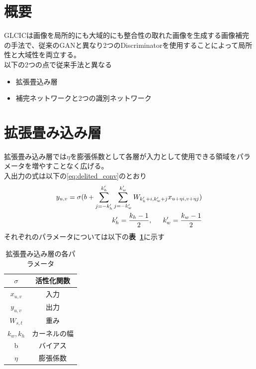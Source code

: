 \documentclass[a4j, 11pt]{jreport}
\newcommand{\tabref}[1]{\textbf{表~\ref{#1}}}
\begin{document}
\section{概要}
GLCICは画像を局所的にも大域的にも整合性の取れた画像を生成する画像補完の手法で、従来のGANと異なり2つのDiscriminatorを使用することによって局所性と大域性を両立する。\\
以下の2つの点で従来手法と異なる
\begin{itemize}
	\item 拡張畳込み層
	\item 補完ネットワークと2つの識別ネットワーク
\end{itemize}
\section{拡張畳み込み層}
拡張畳み込み層では$\eta$を膨張係数として各層が入力として使用できる領域をパラメータを増やすことなく広げる。\\
入出力の式は以下の\eqref{eq:delited_conv}のとおり
\begin{eqnarray}
	y_{u,v}=\sigma(b+\sum^{k'_h}_{j=-k'_h}\sum^{k'_w}_{j=-k'_w}W_{k'_h+i,k'_w+j}x_{u+\eta i,v+\eta j}) \\
	k'_h =\frac{k_h-1}{2},\indent k'_w =\frac{k_w-1}{2}
	\label{eq:delited_conv}
\end{eqnarray}
それぞれのパラメータについては以下の\tabref{tb:delited_conv}に示す
\begin{table}[H]
	\centering
	\caption{拡張畳み込み層の各パラメータ}
	\begin{tabular}{|c|c|}
	\hline
	$\sigma$ & 活性化関数  \\ \hline
	$x_{u,v}$ & 入力     \\ \hline
	$y_{u,v}$ & 出力     \\ \hline
	$W_{s,t}$& 重み     \\ \hline
	$k_w,k_h$ & カーネルの幅 \\ \hline
	b & バイアス   \\ \hline
	$\eta$ & 膨張係数   \\ \hline
	\end{tabular}
	\label{tb:delited_conv}
\end{table}
\end{document}
